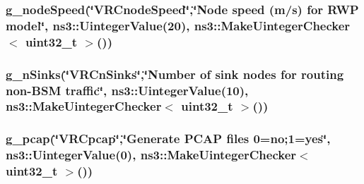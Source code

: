 \subsubsection[{\texorpdfstring{g\+\_\+node\+Speed}{g_nodeSpeed}}]{ g\+\_\+node\+Speed(\char`\"{}V\+R\+Cnode\+Speed\char`\"{},\char`\"{}{\bf Node} {\bf speed} (m/{\bf s}) for R\+WP model\char`\"{}, ns3\+::\+Uinteger\+Value(20), {\bf ns3\+::\+Make\+Uinteger\+Checker}$<$ uint32\+\_\+t $>$())\hspace{0.3cm}{\ttfamily [static]}}\hypertarget{vanet-routing-compare_8cc_ab053d14d08aa881e299f516862ab2dc1}{}\label{vanet-routing-compare_8cc_ab053d14d08aa881e299f516862ab2dc1}
\subsubsection[{\texorpdfstring{g\+\_\+n\+Sinks}{g_nSinks}}]{ g\+\_\+n\+Sinks(\char`\"{}V\+R\+Cn\+Sinks\char`\"{},\char`\"{}Number of sink {\bf nodes} for routing non-\/B\+SM traffic\char`\"{}, ns3\+::\+Uinteger\+Value(10), {\bf ns3\+::\+Make\+Uinteger\+Checker}$<$ uint32\+\_\+t $>$())\hspace{0.3cm}{\ttfamily [static]}}\hypertarget{vanet-routing-compare_8cc_a32b22c3b554cf17e3b7e7da8e15c494d}{}\label{vanet-routing-compare_8cc_a32b22c3b554cf17e3b7e7da8e15c494d}
\subsubsection[{\texorpdfstring{g\+\_\+pcap}{g_pcap}}]{ g\+\_\+pcap(\char`\"{}V\+R\+Cpcap\char`\"{},\char`\"{}Generate P\+C\+AP files 0=no;1=yes\char`\"{}, ns3\+::\+Uinteger\+Value(0), {\bf ns3\+::\+Make\+Uinteger\+Checker}$<$ uint32\+\_\+t $>$())\hspace{0.3cm}{\ttfamily [static]}}\hypertarget{vanet-routing-compare_8cc_a9cf2ca959707252d73a2c9b44ced0829}{}\label{vanet-routing-compare_8cc_a9cf2ca959707252d73a2c9b44ced0829}
